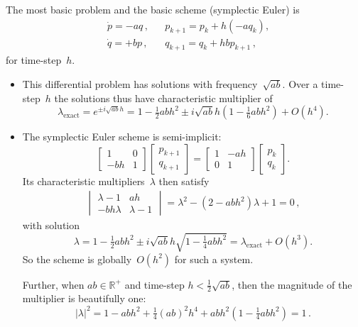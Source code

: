 \documentclass[11pt,a5paper]{article}
\begin{document}
The most basic problem and the basic scheme (symplectic Euler) is
\begin{align*}
&\dot p=-aq\,, &&p_{k+1}=p_k+h(-aq_k),
\\&\dot q=+bp\,, &&q_{k+1}=q_k+hbp_{k+1}\,,
\end{align*}
for time-step~\(h\).
\begin{itemize}
\item This differential problem has solutions with frequency~\(\sqrt{ab}\).
Over a time-step~\(h\) the solutions thus have characteristic multiplier of 
\begin{equation*}
\lambda_{\text{exact}}=e^{\pm i\sqrt{ab}h}
=1-\tfrac12 abh^2\pm i\sqrt{ab}h(1-\tfrac16abh^2)+O(h^4).
\end{equation*}

\item The symplectic Euler scheme is semi-implicit:
\begin{equation*}
\begin{bmatrix} 1&0\\-bh&1 \end{bmatrix}
\begin{bmatrix} p_{k+1}\\q_{k+1} \end{bmatrix}
=\begin{bmatrix} 1&-ah\\0&1 \end{bmatrix}
\begin{bmatrix} p_{k}\\q_{k} \end{bmatrix}.
\end{equation*}
Its characteristic multipliers~\(\lambda\) then satisfy
\begin{align*}
\begin{vmatrix} \lambda-1&ah\\-bh\lambda&\lambda-1 \end{vmatrix}
=\lambda^2-(2-abh^2)\lambda+1=0\,,
\end{align*}
with solution
\begin{equation*}
\lambda=1-\tfrac12abh^2\pm i\sqrt{ab}h\sqrt{1-\tfrac14abh^2}
=\lambda_{\text{exact}}+O(h^3).
\end{equation*}
So the scheme is globally~\(O(h^2)\) for such a system.

Further, when \(ab\in\mathbb R^+\) and time-step \(h<\tfrac12\sqrt{ab}\), then the magnitude of the multiplier is beautifully one:
\begin{equation*}
|\lambda|^2=1-abh^2+\tfrac14(ab)^2h^4 +abh^2(1-\tfrac14abh^2)=1\,.
\end{equation*}

\end{itemize}
\end{document}
